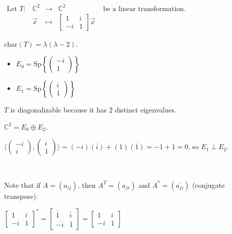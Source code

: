 \documentclass[11pt,fleqn]{book} %
\begin{document}
\begin{example}
    $\begin{matrix} \text{Let }T: &\mathbb{C}^2 &\to &\mathbb{C}^2 &\text{ be a linear transformation. }\\ &\vec{x} &\mapsto &\begin{bmatrix} 1 &i \\ -i &1\end{bmatrix}\vec{x} \end{matrix}$

    $\mathrm{char}(T) = \lambda(\lambda - 2)$.

    \begin{itemize}
        \item $E_0 = \mathrm{Sp}\left\{ \begin{pmatrix} -i \\ 1 \end{pmatrix} \right\}$
        \item $E_1 = \mathrm{Sp}\left\{ \begin{pmatrix} i \\ 1 \end{pmatrix} \right\}$
    \end{itemize}

    $T$ is diagonalizable because it has $2$ distinct eigenvalues.

    $\mathbb{C}^2 = E_0 \oplus E_2$.

    $\langle \begin{pmatrix} -i \\ i \end{pmatrix}, \begin{pmatrix} i \\ 1 \end{pmatrix} \rangle = (-i)\overline{(i)} + (1)\overline{(1)} = -1 + 1 = 0$, so $E_1 \perp E_2$.

    {~~~}

    Note that if $A = (a_{ij})$, then $A^T = (a_{ji})$ and $A^* = (\overline{a_{ji}})$ (conjugate transpose).

    $\begin{bmatrix} 1 &i \\ -i &1 \end{bmatrix}^* = \begin{bmatrix} \overline{1} &\overline{i} \\ \overline{-i} &\overline{1} \end{bmatrix} = \begin{bmatrix} 1 &i \\ -i &1 \end{bmatrix}$
\end{example}
\end{document}
